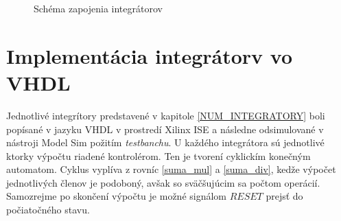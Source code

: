 \begin{figure}[h]
\centering
{}
\caption{Schéma zapojenia integrátorov \cite{MatecnyBP}}
\label{ppi_fp_sustava}
\end{figure}
\bigskip


\chapter{Implementácia integrátorv vo VHDL}
Jednotlivé integrítory predstavené v kapitole \ref{NUM_INTEGRATORY} boli popísané v jazyku VHDL v prostredí Xilinx ISE a následne odsimulované v nástroji Model Sim požitím \textit{testbanchu}. U každého integrátora sú jednotlivé ktorky výpočtu riadené kontrolérom. Ten je tvorení cyklickím konečným automatom. Cyklus vyplíva z rovníc \eqref{suma_mul} a \eqref{suma_div}, kedže výpočet jednotlivých členov je podoboný, avšak so sväčšujúcim sa počtom operácií. Samozrejme po skončení výpočtu je možné signálom $ RESET $ prejsť do počiatočného stavu. 

